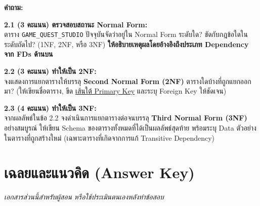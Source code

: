 \documentclass[a4paper,12pt]{article}
\begin{document}
\vspace{0.5cm}
\textbf{คำถาม:}

\textbf{2.1 (3 คะแนน) ตรวจสอบสถานะ Normal Form:}\\
ตาราง \texttt{GAME\_QUEST\_STUDIO} ปัจจุบันจัดว่าอยู่ใน Normal Form ระดับใด? ขัดกับกฎข้อใดในระดับถัดไป? (1NF, 2NF, หรือ 3NF) \textbf{ให้อธิบายเหตุผลโดยอ้างอิงถึงประเภท Dependency จาก FDs ด้านบน}
\vspace{3.5cm}

\textbf{2.2 (3 คะแนน) ทำให้เป็น 2NF:}\\
จงแสดงการแยกตารางให้บรรลุ \textbf{Second Normal Form (2NF)} ตารางใดบ้างที่ถูกแยกออกมา? (ให้เขียนชื่อตาราง, ขีด \uline{เส้นใต้ Primary Key} และระบุ Foreign Key ให้ชัดเจน)
\vspace{4.5cm}

\newpage
\textbf{2.3 (4 คะแนน) ทำให้เป็น 3NF:}\\
จากผลลัพธ์ในข้อ 2.2 จงดำเนินการแยกตารางต่อจนบรรลุ \textbf{Third Normal Form (3NF)} อย่างสมบูรณ์ ให้เขียน Schema ของตารางทั้งหมดที่ได้เป็นผลลัพธ์สุดท้าย พร้อมระบุ Data ตัวอย่างในตารางที่ถูกสร้างใหม่ (เฉพาะตารางที่เกิดจากการแก้ Transitive Dependency)
\newpage
\section*{เฉลยและแนวคิด (Answer Key)}
\textit{เอกสารส่วนนี้สำหรับผู้สอน หรือใช้ประเมินตนเองหลังทำข้อสอบ}
\end{document}
